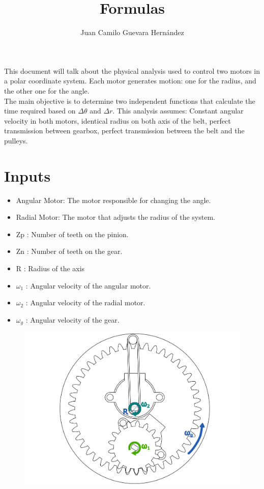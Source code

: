 \documentclass{article}
\title{Formulas}
\author{Juan Camilo Guevara Hernández}
\begin{document}
\maketitle
This document will talk about the physical analysis used to control two motors in a polar coordinate system. Each motor generates motion: one for the radius, and the other one for the angle. \\
The main objective is to determine two independent functions that calculate the time required based on $\Delta \theta$ and $\Delta r$.
This analysis assumes: Constant angular velocity in both motors, identical radius on both axis of the belt, perfect transmission between gearbox, perfect transmission between the belt and the pulleys.\\
\newpage
\section{Inputs}
\begin{itemize}
  \item Angular Motor: The motor responsible for changing the angle.
  \item Radial Motor: The motor that adjusts the radius of the system.
  \item Zp : Number of teeth on the pinion.  
  \item Zn : Number of teeth on the gear.  
  \item R : Radius of the axis
  \item $\omega_1$ : Angular velocity of the angular motor.
  \item $\omega_2$ : Angular velocity of the radial motor.
  \item $\omega_g$ : Angular velocity of the gear.
\end{itemize}
\begin{figure}[htbp]
  \centering
  \includegraphics[scale=0.3]{./graph1.pdf}
\end{figure}
\end{document}
